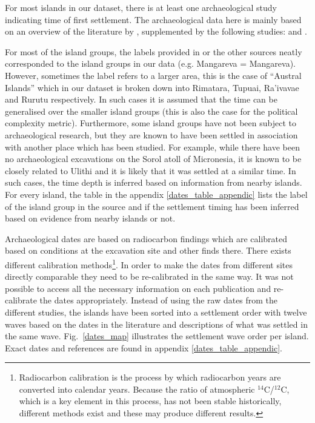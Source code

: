 \documentclass[a4paper,10pt]{article} %
\begin{document}
For most islands in our dataset, there is at least one archaeological study indicating time of first settlement. The archaeological data here is mainly based on an overview of the literature by \citet{rieth_cochrane_2018}, supplemented by the following studies: \citet{intoh2007reconnaissance, intoh2008ongoing, carson2012recent, kirch2012basline, Napolitano_et_al_yap, ellis2012saipan} and \citet{levin_seikel_miles_2019}. 

For most of the island groups, the labels provided in \citet{rieth_cochrane_2018} or the other sources neatly corresponded to the island groups in our data (e.g. Mangareva = Mangareva). However, sometimes the label refers to a larger area, this is the case of ``Austral Islands'' which in our dataset is broken down into Rimatara, Tupuai, Ra'ivavae and Rurutu respectively. In such cases it is assumed that the time can be generalised over the smaller island groups (this is also the case for the political complexity metric). Furthermore, some island groups have not been subject to archaeological research, but they are known to have been settled in association with another place which has been studied. For example, while there have been no archaeological excavations on the Sorol atoll of Micronesia, it is known to be closely related to Ulithi \citep[23]{quackenbush1968sonsorol} and it is likely that it was settled at a similar time. In such cases, the time depth is inferred based on information from nearby islands. For every island, the table in the appendix \ref{dates_table_appendic} lists the label of the island group in the source and if the settlement timing has been inferred based on evidence from nearby islands or not.

Archaeological dates are based on radiocarbon findings which are calibrated based on conditions at the excavation site and other finds there. There exists different calibration methods\footnote{Radiocarbon calibration is the process by which radiocarbon years are converted into calendar years. Because the ratio of atmospheric $^{14}$C/$^{12}$C, which is a key element in this process, has not been stable historically, different methods exist and these may produce different results.}. In order to make the dates from different sites directly comparable they need to be re-calibrated in the same way. It was not possible to access all the necessary information on each publication and re-calibrate the dates appropriately. Instead of using the raw dates from the different studies, the islands have been sorted into a settlement order with twelve waves based on the dates in the literature and descriptions of what was settled in the same wave. Fig.~\ref{dates_map} illustrates the settlement wave order per island. Exact dates and references are found in appendix \ref{dates_table_appendic}.
\end{document}
